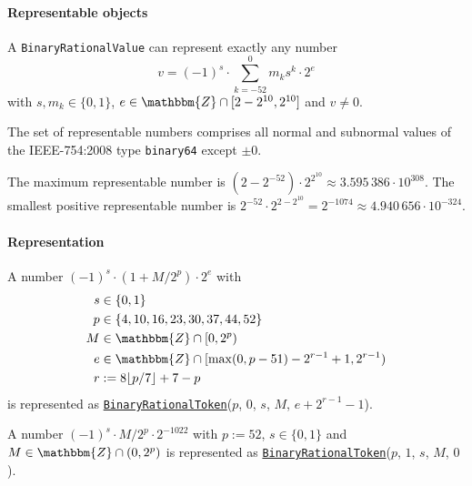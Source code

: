 \documentclass[headings=normal, headsepline, numbers=noenddot, fleqn, a4paper]{scrartcl}
\newcommand{\DborSyntaxIdent}[1]{\texttt{#1}}
\newcommand{\DborSyntaxIdentRef}[1]{\hyperlink{sec:def:#1}{\DborSyntaxIdent{#1}}}
\begin{document}
    \paragraph{Representable objects}

    A \DborSyntaxIdent{BinaryRationalValue} can represent exactly any number
    \begin{equation}
        v = (-1)^s \cdot \sum_{k = -52}^0 m_k s^k \cdot 2^e
    \end{equation}
    with $s, m_k \in \{0, 1\}$, $e \in \mathbbm{Z} \cap [2 - 2^{10}, 2^{10}]$ and $v \ne 0$.

    The set of representable numbers comprises all normal and subnormal values of the IEEE-754:2008 type
    \texttt{binary64} except $\pm 0$.

    \smallskip
    The maximum representable number is $(2 - 2^{-52}) \cdot 2^{2^{10}} \approx 3.595\,386 \cdot 10^{308}$.
    The smallest positive representable number is $2^{-52} \cdot 2^{2-2^{10}} = 2^{-1074}
    \approx 4.940\,656 \cdot 10^{-324}$.

    \paragraph{Representation}

    A number $(-1)^s \cdot (1 + M/2^p) \cdot 2^e$ with
    \begin{align*}
        s & \in \{0, 1\} \\
        p & \in \{4, 10, 16, 23, 30, 37, 44, 52\} \\
        M & \in \mathbbm{Z} \cap [0, 2^p) \\
        e & \in \mathbbm{Z} \cap [\max(0, p - 51) - 2^{r - 1} + 1, 2^{r - 1}) \\
        r & := 8 \lfloor p / 7 \rfloor + 7 - p
    \end{align*}%
    is represented as
    \DborSyntaxIdentRef{BinaryRationalToken}($p$, $0$, $s$, $M$, $e + 2^{r - 1} - 1$).

    A number $(-1)^s \cdot M/2^p \cdot 2^{-1022}$ with $p := 52$, $s \in \{0, 1\}$ and
    $M \in \mathbbm{Z} \cap (0, 2^p)$ is represented as
    \DborSyntaxIdentRef{BinaryRationalToken}($p$, $1$, $s$, $M$, $0$).
\end{document}
